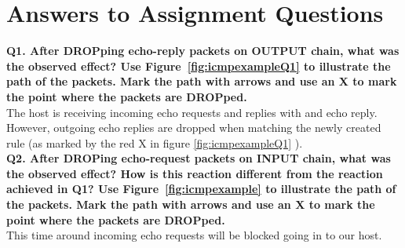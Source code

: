 \section{Answers to Assignment Questions}

\noindent \textbf{Q1. After DROPping echo-reply packets on OUTPUT chain, what 
was the observed effect? Use Figure~\ref{fig:icmpexampleQ1} to illustrate the 
path of the packets. Mark the path with arrows and use an X to mark the point 
where the packets are DROPped.}
~\ \\

The host is receiving incoming echo requests and replies with and echo reply. However, outgoing echo replies are dropped when matching the newly created rule (as marked by the red X in figure \ref{fig:icmpexampleQ1} ).
~\ \\

\noindent \textbf{Q2. After DROPing echo-request packets on INPUT chain, what
was the observed effect? How is this reaction different from the reaction
achieved in Q1? Use Figure~\ref{fig:icmpexample} to illustrate the path of 
the
packets. Mark the path with arrows and use an X to mark the point where the
packets are DROPped.}
~\ \\

This time around incoming echo requests will be blocked going in to our host.
~\ \\

